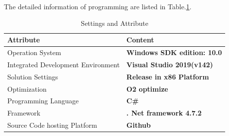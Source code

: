 The detailed information of programming are listed in Table.\ref{tab:environment}.
\begin{table}[!hpbt]
	\centering
	\begin{tabular}{|l|l|}
	\hline
	Attribute & Content  \\ \hline
	Operation System & \textbf{Windows SDK edition: 10.0}  \\ \hline
	Integrated Development Environment  &  \textbf{Visual Studio 2019(v142)}    \\ \hline
	Solution Settings &  \textbf{Release in x86 Platform}\\\hline
	Optimization  &  \textbf{O2 optimize} \\ \hline
	Programming Language &  \textbf{C\#} \\ \hline
	Framework &  \textbf{. Net framework 4.7.2}\\ \hline
	Source Code hosting Platform &  \textbf{Github} \\ \hline
	\end{tabular}
	\caption{Settings and Attribute}
	\label{tab:environment}
\end{table}

